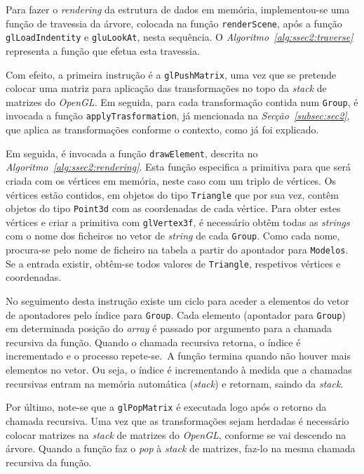 Para fazer o \emph{rendering} da estrutura de dados em memória, implementou-se
uma função de travessia da árvore, colocada na função \texttt{renderScene}, após
a função \texttt{glLoadIndentity} e \texttt{gluLookAt}, nesta sequência.
O \emph{Algoritmo~\ref{alg:ssec2:traverse}} representa a função que efetua esta
travessia.

Com efeito, a primeira instrução é a \texttt{glPushMatrix}, uma vez que se
pretende colocar uma matriz para aplicação das transformações no topo da
\emph{stack} de matrizes do \emph{OpenGL}. Em seguida, para cada transformação
contida num \texttt{Group}, é invocada a função \texttt{applyTrasformation}, já
mencionada na \emph{Secção~\ref{subsec:sec2}}, que aplica as transformações
conforme o contexto, como já foi explicado.

Em seguida, é invocada a função \texttt{drawElement}, descrita no
\emph{Algoritmo~\ref{alg:ssec2:rendering}}. Esta função especifica a primitiva
para que será criada com os vértices em memória, neste caso com um triplo de
vértices. Os vértices estão contidos, em objetos do tipo \texttt{Triangle} que
por sua vez, contêm objetos do tipo \texttt{Point3d} com as coordenadas de cada
vértice. Para obter estes vértices e criar a primitiva com \texttt{glVertex3f},
é necessário obtêm todas as \emph{strings} com o nome dos ficheiros no vetor de
\emph{string} de cada \texttt{Group}. Como cada nome, procura-se pelo
nome de ficheiro na tabela a partir do apontador para \texttt{Modelos}. Se
a entrada existir, obtêm-se todos valores de \texttt{Triangle}, respetivos
vértices e coordenadas.

No seguimento desta instrução existe um ciclo para aceder a elementos do vetor
de apontadores pelo índice para \texttt{Group}. Cada elemento (apontador para
\texttt{Group}) em determinada posição do \emph{array} é passado por argumento
para a chamada recursiva da função. Quando o chamada recursiva retorna, o índice
é incrementado e o processo repete-se.\ A função termina quando não houver mais
elementos no vetor.  Ou seja, o índice é incrementando à medida que
a chamadas recursivas entram na memória automática (\emph{stack}) e retornam,
saindo da \emph{stack}. 

Por último, note-se que a \texttt{glPopMatrix} é executada logo após o retorno
da chamada recursiva. Uma vez que as transformações sejam herdadas é necessário
colocar matrizes na \emph{stack} de matrizes do \emph{OpenGL}, conforme se vai
descendo na árvore. Quando a função faz o \emph{pop} à \emph{stack} de matrizes,
faz-lo na mesma chamada recursiva da função.

